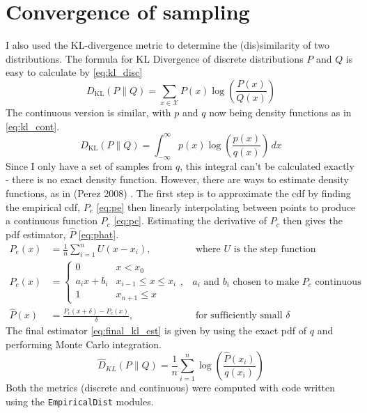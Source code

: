 \documentclass[sigconf]{acmart}
\begin{document}
\FloatBarrier

\section{Convergence of sampling}
I also used the KL-divergence metric to determine the (dis)similarity of two distributions. The formula for KL Divergence of discrete distributions $P$ and $Q$ is easy to calculate by \eqref{eq:kl_disc}
%
\begin{equation} \label{eq:kl_disc}
  {D_{\text{KL}}(P\parallel Q)=\sum _{x\in {\mathcal {X}}}P(x)\log \left({\frac {P(x)}{Q(x)}}\right)}
\end{equation}
%
The continuous version is similar, with $p$ and $q$ now being density functions as in \eqref{eq:kl_cont}.
%
\begin{equation} \label{eq:kl_cont}
  {D_\text{KL}}(P\parallel Q)=\int _{-\infty }^{\infty }p(x)\log \left({\frac {p(x)}{q(x)}}\right)\,dx
\end{equation}
%
Since I only have a set of samples from $q$, this integral can't be calculated exactly - there is no exact density function. However, there are ways to estimate density functions, as in (Perez 2008) \cite{perez2008kullback}. The first step is to approximate the cdf by finding the empirical cdf, $P_e$ \eqref{eq:pe} then linearly interpolating between points to produce a continuous function $P_c$ \eqref{eq:pc}. Estimating the derivative of $P_c$ then gives the pdf estimator, $\hat{P}$ \eqref{eq:phat}.
%
\begin{align}
  P_e(x)     & = \frac1{n}\sum_{i=1}^n U(x-x_i) ,        & \text{ where $U$ is the step function}\label{eq:pe}    \\
  P_c(x)     & = \begin{cases}
    0          & x<x_0                                                                                          \\
    a_ix+b_i   & x_{i-1} \leq x \le x_i                                                                         \\
    1          & x_{n+1} \leq x
  \end{cases} \label{eq:pc} ,& \text{$a_i$ and $b_i$ chosen to make $P_c$ continuous }\\
  \hat{P}(x) & = \frac{P_c(x+\delta) - P_c(x)}{\delta} , & \text{ for sufficiently small }\delta  \label{eq:phat}
\end{align}
%
The final estimator \eqref{eq:final_kl_est} is given by using the exact pdf of $q$ and performing Monte Carlo integration.
%
\begin{equation}
  \label{eq:final_kl_est}
  \hat{D}_{KL}(P \| Q) = \frac1{n}\sum_{i=1}^n \log\left(\frac{\hat{P}(x_i)}{q(x_i)}\right)
\end{equation}
%
Both the metrics (discrete and continuous) were computed with code written using the \texttt{EmpiricalDist} modules.
\end{document}
